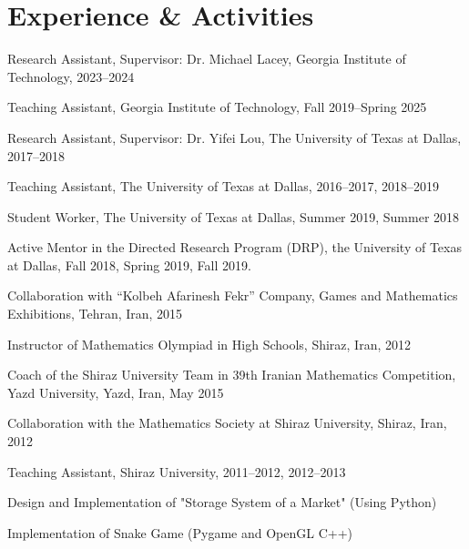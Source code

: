 \documentclass[11pt]{article}
\newenvironment{innerlist}[1][\enskip\textbullet]
        {\begin{compactitem}[#1]}{\end{compactitem}}
\begin{document}




\section{Experience \& Activities}
\vspace{2 mm}
\begin{compactitem}
\item{Research Assistant, Supervisor: Dr. Michael Lacey, Georgia Institute of Technology, 2023--2024}
\item{Teaching Assistant, Georgia Institute of Technology, Fall 2019--Spring 2025}
\item{Research Assistant, Supervisor: Dr. Yifei Lou, The University of Texas at Dallas, 2017--2018}
\item{Teaching Assistant, The University of Texas at Dallas, 2016--2017, 2018--2019}
\item{Student Worker, The University of Texas at Dallas, Summer 2019, Summer 2018 }
\item Active Mentor in the Directed Research Program (DRP), the University of Texas at Dallas, Fall 2018, Spring 2019, Fall 2019.
\item{Collaboration with ``Kolbeh Afarinesh Fekr'' Company, Games and Mathematics Exhibitions, Tehran, Iran, 2015}
\item{Instructor of Mathematics Olympiad in High Schools, Shiraz, Iran, 2012}
\item{Coach of the Shiraz University Team in 39th Iranian Mathematics Competition, Yazd University, Yazd, Iran, May 2015}
\item{Collaboration with the Mathematics Society at Shiraz University, Shiraz, Iran, 2012}
\item{Teaching Assistant, Shiraz University, 2011--2012, 2012--2013}
\item{Design and Implementation of "Storage System of a Market" (Using Python)}
\item{Implementation of Snake Game (Pygame and OpenGL C++)}
\end{compactitem}
\end{document}
